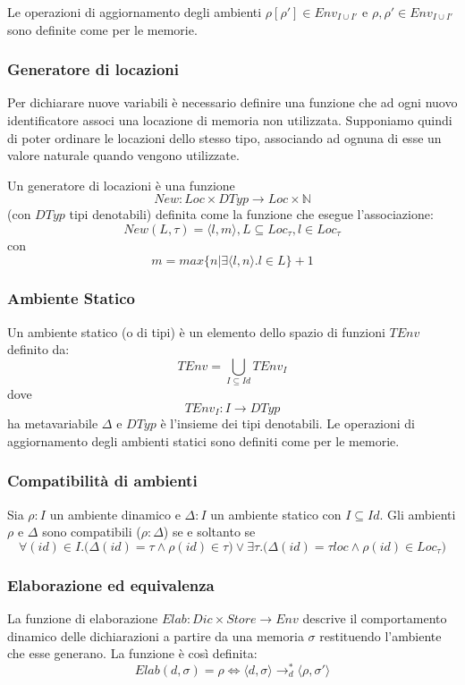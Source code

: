 \documentclass[a4paper, 10pt]{article}
\begin{document}
	Le operazioni di aggiornamento degli ambienti $\rho[\rho'] \in Env_{I \cup I'}$ e $\rho,\rho' \in Env_{I \cup I'}$ sono definite come per le memorie.
	
	\subsubsection{Generatore di locazioni}
	Per dichiarare nuove variabili è necessario definire una funzione che ad ogni nuovo identificatore associ una locazione di memoria non utilizzata. Supponiamo quindi di poter ordinare le locazioni dello stesso tipo, associando ad ognuna di esse un valore naturale quando vengono utilizzate.
	
	Un generatore di locazioni è una funzione 
	\[
	New:Loc \times DTyp \to Loc \times \mathbb{N}
	\]  
	(con $DTyp$ tipi denotabili) definita come la funzione che esegue l'associazione:
	\[
	New(L, \tau) = \langle l,m \rangle, L \subseteq Loc_\tau, l\in Loc_\tau
	\] con 
	\[
	m=max\{n | \exists \langle l,n \rangle.l\in L\}+1
	\]
	
	\subsubsection{Ambiente Statico}
	Un ambiente statico (o di tipi) è un elemento dello spazio di funzioni $TEnv$ definito da: 
	\[
	TEnv= \bigcup\limits_{I \subseteq Id} TEnv_I
	\]
	dove 
	\[
	TEnv_I:I \to DTyp
	\] 
	ha metavariabile $\Delta$ e $DTyp$ è l'insieme dei tipi denotabili. Le operazioni di aggiornamento degli ambienti statici sono definiti come per le memorie.
	
	\subsubsection{Compatibilità di ambienti}
	Sia $\rho : I$ un ambiente dinamico e $\Delta:I$ un ambiente statico con $I\subseteq Id$. Gli ambienti $\rho$ e $\Delta$ sono compatibili ($\rho : \Delta$) se e soltanto se 
	\[
	\forall(id) \in I.\big(\Delta(id)=\tau \wedge \rho(id) \in \tau\big) \vee \exists \tau.\big(\Delta(id) = \tau loc \wedge \rho(id) \in Loc_\tau\big)
	\]
	
	\subsubsection{Elaborazione ed equivalenza}
	La funzione di elaborazione $Elab:Dic \times Store \to Env$ descrive il comportamento dinamico delle dichiarazioni a partire da una memoria $\sigma$ restituendo l'ambiente che esse generano. La funzione è così definita:
	\[
	Elab(d, \sigma)=\rho \iff \langle d,\sigma \rangle \to_d^* \langle \rho, \sigma' \rangle
	\]
	
\end{document}
